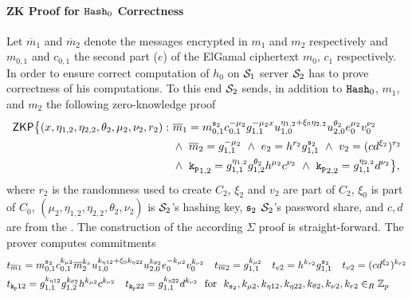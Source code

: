 \paragraph{ZK Proof for $\mathtt{Hash}_0$ Correctness}
Let $\overline{m}_1$ and $\overline{m}_2$ denote the messages encrypted in $m_1$ and $m_2$ respectively and $m_{0,1}$ and $c_{0,1}$ the second part ($e$) of the ElGamal ciphertext $m_0$, $c_1$ respectively.
In order to ensure correct computation of $h_0$ on $\mathcal{S}_1$ server $\mathcal{S}_2$ has to prove correctness of his computations.
To this end $\mathcal{S}_2$ sends, in addition to $\mathtt{Hash}_0$, $m_1$, and $m_2$ the following zero-knowledge proof 
\begin{equation}
\begin{split}
    \mathsf{ZKP}\big\{ (x, \eta_{1,2}, \eta_{2,2}, \theta_2, \mu_2, \nu_2, r_2): ~ &  
      \overline{m}_1 = m_{0,1}^{\mathfrak{s}_2} c_{0,1}^{-\mu_2} g_{1,1}^{-\mu_2 x} u_{1,0}^{\eta_{1,2} + \xi_0 \eta_{2,2}} u_{2,0}^{\theta_2} e_0^{\mu_2} v_0^{\nu_2} \\
      & \wedge ~ \overline{m}_2 = g_{1,1}^{-\mu_2} ~ \wedge ~ e_2 = h^{r_2}g_{1,1}^{\mathfrak{s}_2} ~ \wedge ~ v_2 = (cd^{\xi_2})^{r_2} \\
      & \wedge ~ \mathtt{k_p}_{1,2} = g_{1,1}^{\eta_{1,2}} g_{1,2}^{\theta_2} h^{\mu_2} c^{\nu_2} ~ \wedge ~ \mathtt{k_p}_{2,2} = g_{1,1}^{\eta_{2,2}} d^{\nu_2}
      \big\},
\end{split}
\end{equation}
where $r_2$ is the randomness used to create $C_2$, $\xi_2$ and $v_2$ are part of $C_2$, $\xi_0$ is part of $C_0$, $(\mu_2, \eta_{1,2}, \eta_{2,2}, \theta_2, \nu_2)$ is $\mathcal{S}_2$'s hashing key, $\mathfrak{s}_2$ $\mathcal{S}_2$'s password share, and $c,d$ are from the \crs.
The construction of the according $\Sigma$ proof is straight-forward.
The prover computes commitments
\begin{align*}
  & t_{\overline{m}1} = m_{0,1}^{{\mathfrak{s}_2}} c_{0,1}^{k_{\mu2}} \overline{m}_{2}^{k_{x}} u_{1,0}^{k_{\eta12} + \xi_0 k_{\eta22}} u_{2,0}^{k_{\theta2}} e_0^{-k_{\mu2}} v_0^{k_{\nu2}} ~~~
    t_{\overline{m}2} = g_{1,1}^{k_{\mu2}} ~~~  t_{e2} = h^{k_{r2}}g_{1,1}^{{\mathfrak{s}_2}} ~~~ t_{v2} = (cd^{\xi_2})^{k_{r2}} \\
  & t_{\mathtt{k_p}12} = g_{1,1}^{k_{\eta12}} g_{1,2}^{k_{\theta2}} h^{k_{\mu2}} c^{k_{\nu2}} ~~~ t_{\mathtt{k_p}22} = g_{1,1}^{k_{\eta22}} d^{k_{\nu2}}
    \text{ ~for~ } k_{\mathfrak{s}_2}, k_{\mu2}, k_{\eta12}, k_{\eta22}, k_{\theta2}, k_{\nu2}, k_{r2} \in_R \mathbb{Z}_p
\end{align*}
